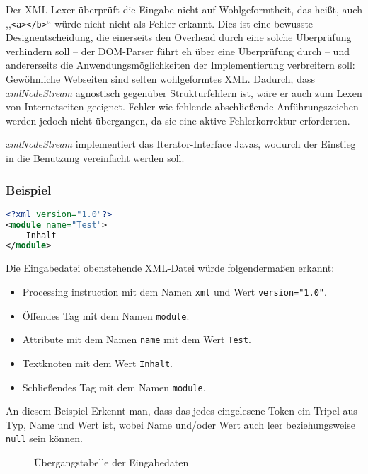 \documentclass[10pt,a4paper,ngerman,titlepage,tocindentauto]{article}
\begin{document}
			Der XML-Lexer überprüft die Eingabe nicht auf Wohlgeformtheit, das heißt, auch
			,,\verb|<a></b>|`` würde nicht nicht als Fehler erkannt. Dies ist eine bewusste Designentscheidung,
			die einerseits den Overhead durch eine solche Überprüfung verhindern soll – der DOM-Parser
			führt eh über eine Überprüfung durch – und andererseits die Anwendungsmöglichkeiten der Implementierung
			verbreitern soll: Gewöhnliche Webseiten sind selten wohlgeformtes XML. Dadurch,
			dass {\em xmlNodeStream} agnostisch gegenüber Strukturfehlern ist, wäre er auch zum
			Lexen von Internetseiten geeignet. Fehler wie fehlende abschließende Anführungszeichen werden
			jedoch nicht übergangen, da sie eine aktive Fehlerkorrektur erforderten.
			
			{\em xmlNodeStream} implementiert das Iterator-Interface Javas, wodurch der Einstieg in die
			Benutzung vereinfacht werden soll.
			
			\subsubsection*{Beispiel}
				\begin{lstlisting}[frame=single,language=XML,caption=Beispiel.xml]
<?xml version="1.0"?>
<module name="Test">
	Inhalt
</module>
				\end{lstlisting}
				Die Eingabedatei obenstehende XML-Datei würde folgendermaßen erkannt:
				\begin{itemize}
					\item Processing instruction mit dem Namen \verb|xml| und Wert \verb|version="1.0"|.
					\item Öffendes Tag mit dem Namen \verb|module|.
					\item Attribute mit dem Namen \verb|name| mit dem Wert \verb|Test|.
					\item Textknoten mit dem Wert \verb|Inhalt|.
					\item Schließendes Tag mit dem Namen \verb|module|.
				\end{itemize}
				An diesem Beispiel Erkennt man, dass das jedes eingelesene Token ein Tripel aus
				Typ, Name und Wert ist, wobei Name und/oder Wert auch leer beziehungsweise \texttt{null} sein können.
			
			\begin{figure}[ht]
				\caption[Übergangstabelle der Eingabedaten]{\hypertarget{Uebergangsdiagramm_XML_Lexer}{Übergangstabelle der Eingabedaten}}
			\end{figure}
			
\end{document}
